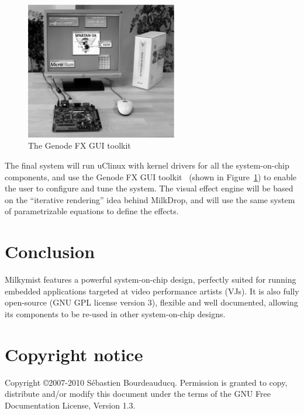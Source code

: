 \documentclass[a4paper,11pt,twocolumn]{paper}
\begin{document}
\begin{figure}
\centering
\includegraphics[height=60mm]{genode_bw.eps}
\caption{The Genode FX GUI toolkit}
\label{fig:genodefx}
\end{figure}

The final system will run uClinux with kernel drivers for all the system-on-chip components, and use the Genode FX GUI toolkit~\cite{genodefx} (shown in Figure~\ref{fig:genodefx}) to enable the user to configure and tune the system. The visual effect engine will be based on the ``iterative rendering'' idea behind MilkDrop, and will use the same system of parametrizable equations to define the effects.

\section{Conclusion}
Milkymist features a powerful system-on-chip design, perfectly suited for running embedded applications targeted at video performance artists (VJs). It is also fully open-source (GNU GPL license version 3), flexible and well documented, allowing its components to be re-used in other system-on-chip designs.

\section*{Copyright notice}
Copyright \copyright 2007-2010 S\'ebastien Bourdeauducq. Permission is granted to copy, distribute and/or modify this document under the terms of the GNU Free Documentation License, Version 1.3.

{}

\end{document}
